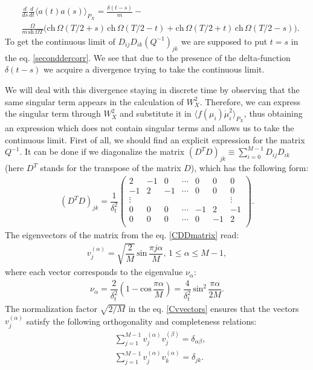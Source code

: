 \documentclass{article}
\begin{document}
\begin{align}\label{seconddercorr}
    &\frac{d}{ds}\frac{d}{dt}\langle a(t) a(s)\rangle_{P_{X}} = \frac{\delta(t-s)}{m}-\nonumber\\
    &\frac{\Omega}{m\, \textrm{sh}\, \Omega T} \Big(\textrm{ch}\, \Omega (T/2+s)\, \textrm{ch}\, \Omega(T/2-t)+\textrm{ch}\, \Omega (T/2+t)\, \textrm{ch}\, \Omega(T/2-s)\Big).
\end{align}
To get the continuous limit of $D_{ij}D_{ik}(Q^{-1})_{jk}$ we are supposed to put $t=s$ in the eq$.$ \eqref{seconddercorr}. We see that due to the presence of the delta-function $\delta(t-s)$ we acquire a divergence trying to take the continuous limit.

We will deal with this divergence staying in discrete time by observing that the same singular term appears in the calculation of $W_{X}^{2}$. Therefore, we can express the singular term through $W_{X}^{2}$ and substitute it in $\langle f(\mu_{i})\dot{\mu}_{i}^{2}\rangle_{P_{X}}$, thus obtaining an expression which does not contain singular terms and allows us to take the continuous limit.
First of all, we should find an explicit expression for the matrix $Q^{-1}$. It can be done if we diagonalize the matrix $ (D^{T}D)_{jk} \equiv\sum_{i=0}^{M-1}D_{ij}D_{ik}$ (here $D^{T}$ stands for the transpose of the matrix $D$), which has the following form: 
\begin{align}\label{CDDmatrix}
    (D^{T}D)_{jk} = \dfrac{1}{\delta_{t}^{2}}
    \begin{pmatrix}
        2 & -1 & 0 & \cdots & 0 & 0 & 0 \\
        -1 & 2 & -1 & \cdots & 0 & 0 & 0 \\
        \vdots &&&&&&\vdots\\
        0 & 0 & 0 & \cdots & -1 & 2 & -1 \\
        0 & 0 & 0 & \cdots & 0 & -1 & 2 \\
    \end{pmatrix}.
\end{align}
The eigenvectors of the matrix from the eq$.$ \eqref{CDDmatrix} read:
\begin{align}\label{Cvvectors}
    v_{j}^{(\alpha)} = \sqrt{\dfrac{2}{M}}\,\textrm{sin}\,\dfrac{\pi j \alpha}{M}, \, 1 \leq \alpha \leq M-1,
\end{align}
where each vector corresponds to the eigenvalue $\nu_{\alpha}$:
\begin{align}\label{Cnualpha}
    \nu_{\alpha} = \dfrac{2}{\delta_{t}^{2}}\left(1 - \textrm{cos}\, \dfrac{\pi \alpha}{M}\right) = \dfrac{4}{\delta_{t}^{2}}\, \textrm{sin}^{2}\,\dfrac{\pi \alpha}{2 M}.
\end{align}
The normalization factor $\sqrt{2/M}$ in the eq$.$ \eqref{Cvvectors} ensures that the vectors $v_{j}^{(\alpha)}$ satisfy the following orthogonality and completeness relations: 
\begin{align}
    &\sum_{j=1}^{M-1} v_{j}^{(\alpha)}v_{j}^{(\beta)} = \delta_{\alpha \beta},\nonumber\\
    &\sum_{j=1}^{M-1} v_{j}^{(\alpha)}v_{k}^{(\alpha)} = \delta_{j k}.
\end{align}
\end{document}
